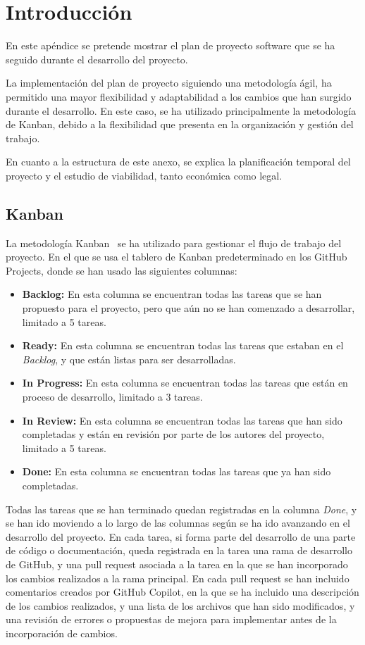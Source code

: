 
\section{Introducción}
En este apéndice se pretende mostrar el plan de proyecto software que se ha seguido durante el desarrollo del proyecto.

La implementación del plan de proyecto siguiendo una metodología ágil, ha permitido una mayor flexibilidad y adaptabilidad a los cambios que han surgido durante el desarrollo. En este caso, se ha utilizado principalmente la metodología de Kanban, debido a la flexibilidad que presenta en la organización y gestión del trabajo.

En cuanto a la estructura de este anexo, se explica la planificación temporal del proyecto y el estudio de viabilidad, tanto económica como legal. 

\subsection{Kanban}
La metodología Kanban~\cite{JuliaMartins2025} se ha utilizado para gestionar el flujo de trabajo del proyecto. En el que se usa el tablero de Kanban predeterminado en los GitHub Projects, donde se han usado las siguientes columnas:
\begin{itemize}
    \item \textbf{Backlog:} En esta columna se encuentran todas las tareas que se han propuesto para el proyecto, pero que aún no se han comenzado a desarrollar, limitado a 5 tareas.
    \item \textbf{Ready:} En esta columna se encuentran todas las tareas que estaban en el \textit{Backlog}, y que están listas para ser desarrolladas.
    \item \textbf{In Progress:} En esta columna se encuentran todas las tareas que están en proceso de desarrollo, limitado a 3 tareas.
    \item \textbf{In Review:} En esta columna se encuentran todas las tareas que han sido completadas y están en revisión por parte de los autores del proyecto, limitado a 5 tareas.
    \item \textbf{Done:} En esta columna se encuentran todas las tareas que ya han sido completadas.
\end{itemize}

Todas las tareas que se han terminado quedan registradas en la columna \textit{Done}, y se han ido moviendo a lo largo de las columnas según se ha ido avanzando en el desarrollo del proyecto. En cada tarea, si forma parte del desarrollo de una parte de código o documentación, queda registrada en la tarea una rama de desarrollo de GitHub, y una pull request asociada a la tarea en la que se han incorporado los cambios realizados a la rama principal. En cada pull request se han incluido comentarios creados por GitHub Copilot, en la que se ha incluido una descripción de los cambios realizados, y una lista de los archivos que han sido modificados, y una revisión de errores o propuestas de mejora para implementar antes de la incorporación de cambios.

